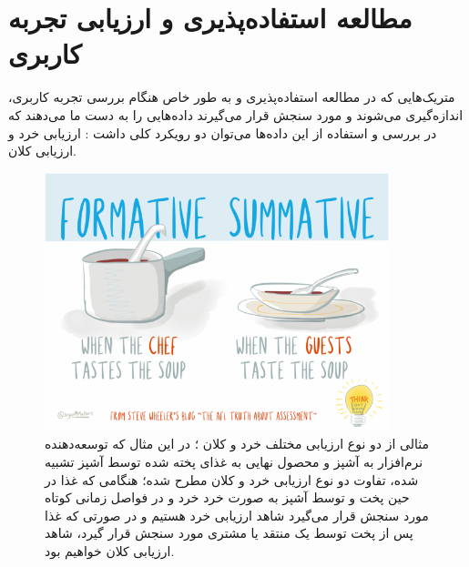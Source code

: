 \section{مطالعه استفاده‌پذیری و ارزیابی تجربه کاربری}
متریک‌هایی که در مطالعه استفاده‌پذیری و به طور خاص هنگام بررسی تجربه کاربری، اندازه‌گیری می‌شوند و مورد سنجش قرار می‌گیرند داده‌هایی را به دست ما می‌دهند که در بررسی و استفاده از این داده‌ها می‌توان دو رویکرد کلی داشت
\cite{albert_measuring_2013}:
ارزیابی خرد و ارزیابی کلان.\\
\begin{figure}
	\centering\includegraphics[width=10cm]{Resources/assessment.PNG}
	\caption[مثالی از دو نوع ارزیابی مختلف خرد و کلان]
	{مثالی از دو نوع ارزیابی مختلف خرد و کلان
		\cite{noauthor_formative_nodate}؛
		در این مثال که توسعه‌دهنده نرم‌افزار به آشپز و محصول نهایی به غذای پخته شده توسط آشپز تشبیه شده، تفاوت دو نوع ارزیابی خرد و کلان مطرح شده؛ هنگامی که غذا در حین پخت و توسط آشپز به صورت خرد خرد و در فواصل زمانی کوتاه مورد سنجش قرار می‌گیرد شاهد ارزیابی خرد هستیم و در صورتی که غذا پس از پخت توسط یک منتقد یا مشتری مورد سنجش قرار گیرد، شاهد ارزیابی کلان خواهیم بود.
	}
	\label{fig:assessment}
\end{figure}
